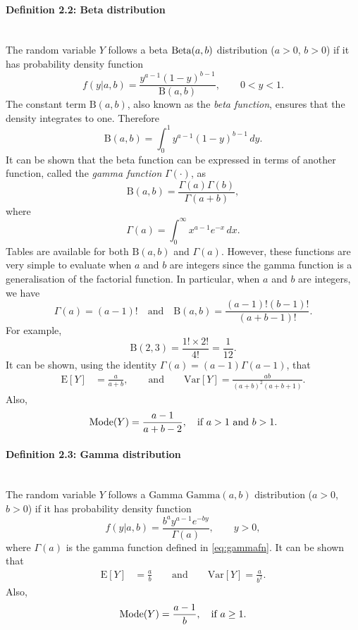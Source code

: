 \paragraph{Definition 2.2: Beta distribution}{~\\
The random variable $Y$ follows a beta $\textnormal{\text{Beta}}(a,b)$ distribution ($a>0$,
\label{def:beta}
$b>0$) if it has probability density function
\begin{equation}
f(y|a,b)=\frac{y^{a-1}(1-y)^{b-1}}{\mathrm{B}(a,b)},\quad\quad 0<y<1.
\label{eq:betapdf}
\end{equation}
The constant term $\mathrm{B}(a,b)$, also known as the {\it beta function},
ensures that the density integrates to one. Therefore
\begin{equation}
\mathrm{B}(a,b)=\int_0^1
y^{a-1}(1-y)^{b-1}\,dy.
\label{eq:betafn}
\end{equation}
It can be shown that the beta function can be expressed in terms of another function, called the {\it gamma function} $\Gamma(\cdot)$, as
$$
\mathrm{B}(a,b) =\frac{\Gamma(a)\Gamma(b)}{\Gamma(a+b)},
$$
where
\begin{equation}
\label{eq:gammafn}
\Gamma(a)=\int_0^\infty x^{a-1}e^{-x}\,dx.
\end{equation}
Tables are available for both $\mathrm{B}(a,b)$ and $\Gamma(a)$. However, these functions are very simple to evaluate when $a$ and $b$ are integers since the gamma function is a generalisation of the factorial function. In particular, when $a$ and $b$ are integers, we have
$$
\Gamma(a)=(a-1)!\quad\text{and}\quad 
\mathrm{B}(a,b)=\frac{(a-1)!(b-1)!}{(a+b-1)!}.
$$
For example,
\begin{equation*}
\mathrm{B}(2,3)=\frac{1!\times2!}{4!}=\frac{1}{12}.
\end{equation*}
It can be shown, using the identity $\Gamma(a)=(a-1)\Gamma(a-1)$, that
\begin{align*}
\text{E}[Y]&=\frac{a}{a+b},\quad\quad\text{and}\quad\quad 
\text{Var}[Y]=\frac{ab}{(a+b)^2(a+b+1)}. 
\end{align*}
Also,
$$\textnormal{Mode}(Y)=\frac{a-1}{a+b-2}, \quad\text{if $a>1$ and $b>1$}.$$}
\clearpage
\paragraph{Definition 2.3: Gamma distribution}{~\\
  The random variable $Y$ follows a Gamma $\text{Gamma}(a,b)$ distribution
  ($a>0$, $b>0$) if it has probability density function
$$f(y|a,b) =\frac{b^ay^{a-1}e^{-by}}{\Gamma(a)},\quad\quad y>0,$$ where $\Gamma(a)$ is the gamma function defined in
\eqref{eq:gammafn}. It can be shown that
\begin{align*}
\text{E}[Y]&=\frac{a}{b}\quad\quad\text{and}\quad\quad 
\text{Var}[Y]=\frac{a}{b^2}. 
\end{align*}
Also,
$$\textnormal{Mode}(Y)=\frac{a-1}{b}, \quad\text{if $a\geq 1$}.
$$}

